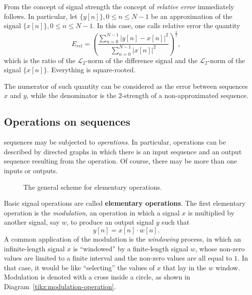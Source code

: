 \documentclass[\documentfontsize, twocolumn]{\classname}
\begin{document}
From the concept of signal strength the concept of \emph{relative error} immediately follows. In particular, let $\{y[n]\}, 0 \leq n \leq N - 1$ be an approximation of the signal $\{x[n]\}, 0 \leq n \leq N - 1$. In this case, one calls relative error the quantity
\begin{equation}\label{eqn:RelativeError}
	E_{rel} = \left(\frac{\sum_{n=0}^{N-1} |y[n] - x[n]|^2}{\sum_{n=0}^{N-1} |x[n]|^2}\right)^\frac{1}{2},
\end{equation}
which is the ratio of the $\mathcal L_2$-norm of the difference signal and the $\mathcal L_2$-norm of the signal $\{x[n]\}$. Everything is square-rooted.

The numerator of such quantity can be considered as the error between se\-quen\-ces $x$ and $y$, while the denominator is the $2$-strength of a non-approximated se\-quen\-ce.

\subsection{Operations on se\-quen\-ces}\label{sec:operationsOnSequences}

se\-quen\-ces may be subjected to \emph{operations}. In particular, operations can be described by directed graphs in which there is an input se\-quen\-ce and an output se\-quen\-ce resulting from the operation. Of course, there may be more than one inputs or outputs.

    \begin{figure}[ht]
\begin{center}
\caption{The general scheme for elementary operations.}\label{tikz:operation-scheme}
\end{center}
\end{figure}

Basic signal operations are called \textbf{elementary operations}. The first
elementary operation is the \emph{modulation}, an operation in which a signal
$x$ is multiplied by another signal, say $w$, to produce an output signal $y$
such that $$y[n] = x[n]\cdot w[n].$$ A common application of the modulation is
the \emph{windowing} process, in which an infinite-length signal $x$ is
``windowed'' by a finite-length signal $w$, whose non-zero values are limited
to a finite interval and the non-zero values are all equal to $1$. In that
case, it would be like ``selecting'' the values of $x$ that lay in the $w$
window. Modulation is denoted with a cross inside a circle, as shown in Diagram~\ref{tikz:modulation-operation}.
\end{document}
